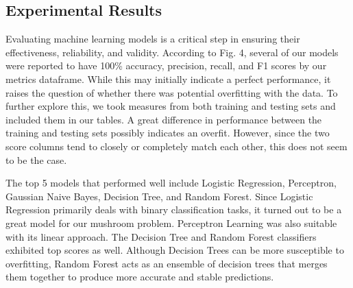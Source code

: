 \documentclass[11pt, conference]{IEEEtran}
\begin{document}
    \begin{figure}[htbp]
        \centering
    \end{figure}

    \subsection{Experimental Results}
    Evaluating machine learning models is a critical step in ensuring their effectiveness, reliability, and validity. According to Fig. 4, several of our models were reported to have 100\% accuracy, precision, recall, and F1 scores by our metrics dataframe. While this may initially indicate a perfect performance, it raises the question of whether there was potential overfitting with the data. To further explore this, we took measures from both training and testing sets and included them in our tables. A great difference in performance between the training and testing sets possibly indicates an overfit. However, since the two score columns tend to closely or completely match each other, this does not seem to be the case.
    
    The top 5 models that performed well include Logistic Regression, Perceptron, Gaussian Naive Bayes, Decision Tree, and Random Forest. Since Logistic Regression primarily deals with binary classification tasks, it turned out to be a great model for our mushroom problem. Perceptron Learning was also suitable with its linear approach. The Decision Tree and Random Forest classifiers exhibited top scores as well. Although Decision Trees can be more susceptible to overfitting, Random Forest acts as an ensemble of decision trees that merges them together to produce more accurate and stable predictions. 
\end{document}
